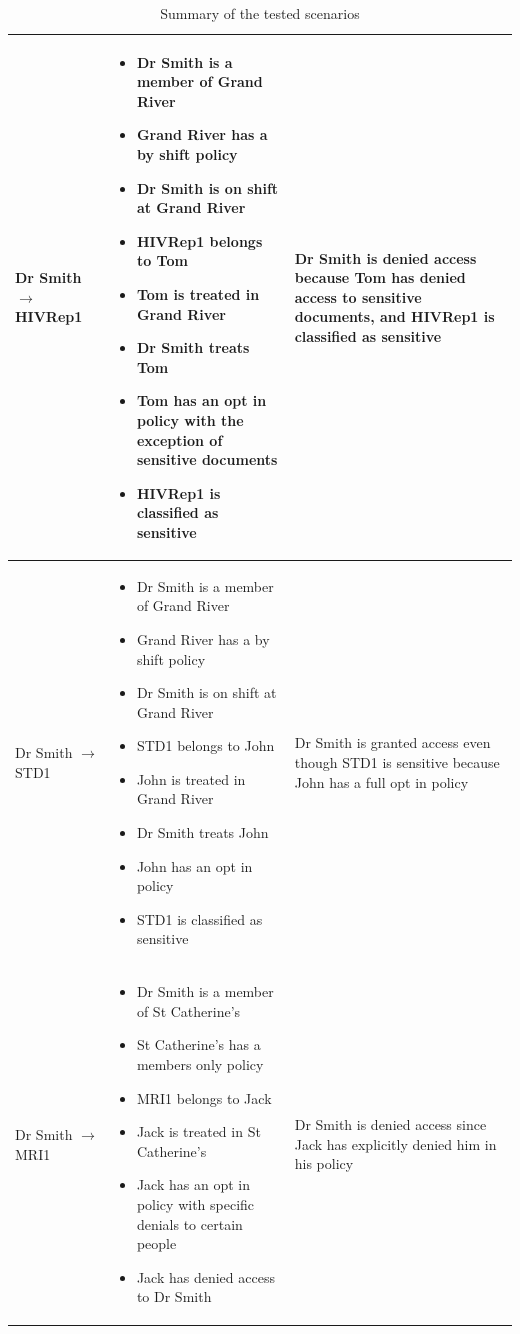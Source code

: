 \documentclass[conference]{IEEEtran}
\begin{document}
\begin{table}[!t]
{\begin{tabular}{m{3cm}|m{9cm}|m{5cm}}
\hline
Dr Smith $\rightarrow$ HIVRep1 & \begin{itemize}
                                  \item Dr Smith is a member of Grand River
\item Grand River has a by shift policy
\item Dr Smith is on shift at Grand River
\item HIVRep1 belongs to Tom
\item Tom is treated in Grand River
\item Dr Smith treats Tom
\item Tom has an opt in policy with the exception of sensitive documents
\item HIVRep1 is classified as sensitive
                                 \end{itemize} & Dr Smith is denied access because Tom has denied access to sensitive documents, and HIVRep1 is classified as
sensitive\\
\hline
Dr Smith $\rightarrow$ STD1 & \begin{itemize}
                               \item Dr Smith is a member of Grand River
\item Grand River has a by shift policy
\item Dr Smith is on shift at Grand River
\item STD1 belongs to John
\item John is treated in Grand River
\item Dr Smith treats John
\item John has an opt in policy
\item STD1 is classified as sensitive
                              \end{itemize} & Dr Smith is granted access even though STD1 is sensitive because John has a full opt in policy\\

\hline
Dr Smith $\rightarrow$ MRI1 & \begin{itemize}
                               \item Dr Smith is a member of St Catherine's
\item St Catherine's has a members only policy
\item MRI1 belongs to Jack
\item Jack is treated in St Catherine's
\item Jack has an opt in policy with specific denials to certain people
\item Jack has denied access to Dr Smith
                              \end{itemize} & Dr Smith is denied access since Jack has explicitly denied him in his policy\\                           
\end{tabular}
}
\caption{Summary of the tested scenarios}
\label{tab:scenarios}
\end{table}
\end{document}
